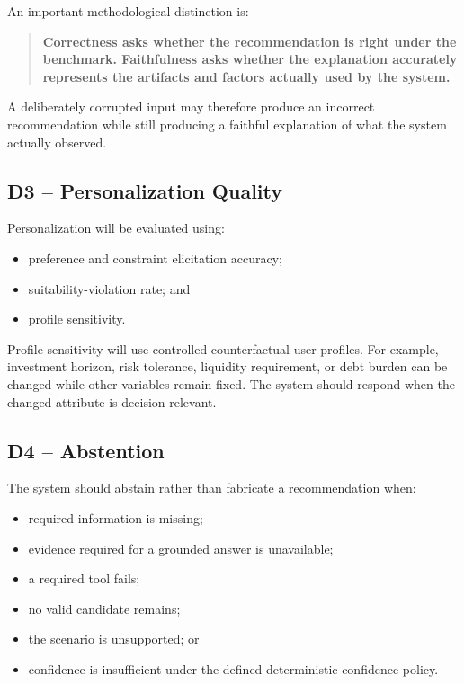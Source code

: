 \documentclass[12pt,a4paper]{article}
\begin{document}
An important methodological distinction is:

\begin{quote}
\textbf{Correctness asks whether the recommendation is right under the benchmark. Faithfulness asks whether the explanation accurately represents the artifacts and factors actually used by the system.}
\end{quote}

A deliberately corrupted input may therefore produce an incorrect recommendation while still producing a faithful explanation of what the system actually observed.

\subsection{D3 -- Personalization Quality}

Personalization will be evaluated using:
\begin{itemize}
    \item preference and constraint elicitation accuracy;
    \item suitability-violation rate; and
    \item profile sensitivity.
\end{itemize}

Profile sensitivity will use controlled counterfactual user profiles. For example, investment horizon, risk tolerance, liquidity requirement, or debt burden can be changed while other variables remain fixed. The system should respond when the changed attribute is decision-relevant.

\subsection{D4 -- Abstention}

The system should abstain rather than fabricate a recommendation when:
\begin{itemize}
    \item required information is missing;
    \item evidence required for a grounded answer is unavailable;
    \item a required tool fails;
    \item no valid candidate remains;
    \item the scenario is unsupported; or
    \item confidence is insufficient under the defined deterministic confidence policy.
\end{itemize}
\end{document}
